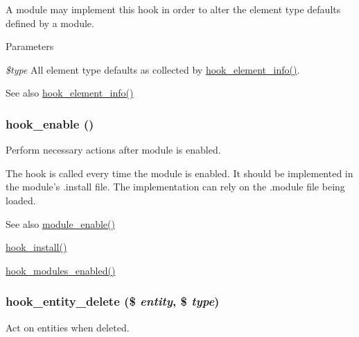 A module may implement this hook in order to alter the element type defaults defined by a module.


\begin{DoxyParams}{Parameters}
\item[{\em \$type}]All element type defaults as collected by \hyperlink{group__hooks_ga3c5182432eddc82f8b7845e66a365d51}{hook\_\-element\_\-info()}.\end{DoxyParams}
\begin{DoxySeeAlso}{See also}
\hyperlink{group__hooks_ga3c5182432eddc82f8b7845e66a365d51}{hook\_\-element\_\-info()} 
\end{DoxySeeAlso}
\hypertarget{group__hooks_gaedcfb58c08d5c5f8ffcd1059ceeb39e4}{
\subsubsection[{hook\_\-enable}]{\setlength{\rightskip}{0pt plus 5cm}hook\_\-enable ()}}
\label{group__hooks_gaedcfb58c08d5c5f8ffcd1059ceeb39e4}
Perform necessary actions after module is enabled.

The hook is called every time the module is enabled. It should be implemented in the module's .install file. The implementation can rely on the .module file being loaded.

\begin{DoxySeeAlso}{See also}
\hyperlink{module_8inc_a4b2c9ea60d7c88595eaebfc4abd5f1bf}{module\_\-enable()} 

\hyperlink{group__hooks_ga1ecdb5a2a046ea63dc790c3ed90338e5}{hook\_\-install()} 

\hyperlink{group__hooks_ga0eb7c67333e0f40b4a46c0dc4c4a92f3}{hook\_\-modules\_\-enabled()} 
\end{DoxySeeAlso}
\hypertarget{group__hooks_gac329b7f9d18e7fbccb6057e6f4bc4cb9}{
\subsubsection[{hook\_\-entity\_\-delete}]{\setlength{\rightskip}{0pt plus 5cm}hook\_\-entity\_\-delete (\$ {\em entity}, \/  \$ {\em type})}}
\label{group__hooks_gac329b7f9d18e7fbccb6057e6f4bc4cb9}
Act on entities when deleted.


